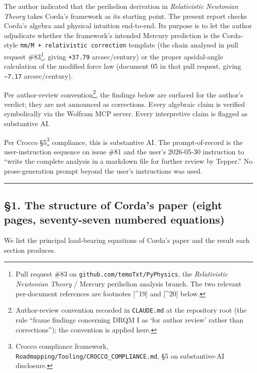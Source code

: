 \documentclass[
  11pt,
]{article}
\begin{document}
The author indicated that the perihelion derivation in
\emph{Relativistic Newtonian Theory} takes Corda's framework as its
starting point. The present report checks Corda's algebra and physical
intuition end-to-end. Its purpose is to let the author adjudicate
whether the framework's intended Mercury prediction is the Corda-style
\texttt{πm/M\ +\ relativistic\ correction} template (the chain analysed
in pull request \#83\footnote{Pull request \#83 on
  \texttt{github.com/temoTxt/PyPhysics}, the \emph{Relativistic
  Newtonian Theory} / Mercury perihelion analysis branch. The two
  relevant per-document references are footnotes {[}\^{}19{]} and
  {[}\^{}20{]} below.}, giving \texttt{+37.79} arcsec/century) or the
proper apsidal-angle calculation of the modified force law (document 05
in that pull request, giving \texttt{−7.17} arcsec/century).

Per author-review convention\footnote{Author-review convention recorded
  in \texttt{CLAUDE.md} at the repository root (the rule ``frame
  findings concerning DRQM I as `for author review' rather than
  corrections''); the convention is applied here.}, the findings below
are surfaced for the author's verdict; they are not announced as
corrections. Every algebraic claim is verified symbolically via the
Wolfram MCP server. Every interpretive claim is flagged as substantive
AI.

Per Crocco §5\footnote{Crocco compliance framework,
  \texttt{Roadmapping/Tooling/CROCCO\_COMPLIANCE.md}, §5 on
  substantive-AI disclosure.} compliance, this is substantive AI. The
prompt-of-record is the user-instruction sequence on issue \#81 and the
user's 2026-05-30 instruction to ``write the complete analysis in a
markdown file for further review by Tepper.'' No prose-generation prompt
beyond the user's instructions was used.

\begin{center}\rule{0.5\linewidth}{0.5pt}\end{center}

\hypertarget{the-structure-of-cordas-paper-eight-pages-seventy-seven-numbered-equations}{%
\subsection{§1. The structure of Corda's paper (eight pages,
seventy-seven numbered
equations)}\label{the-structure-of-cordas-paper-eight-pages-seventy-seven-numbered-equations}}

We list the principal load-bearing equations of Corda's paper and the
result each section produces.
\end{document}
